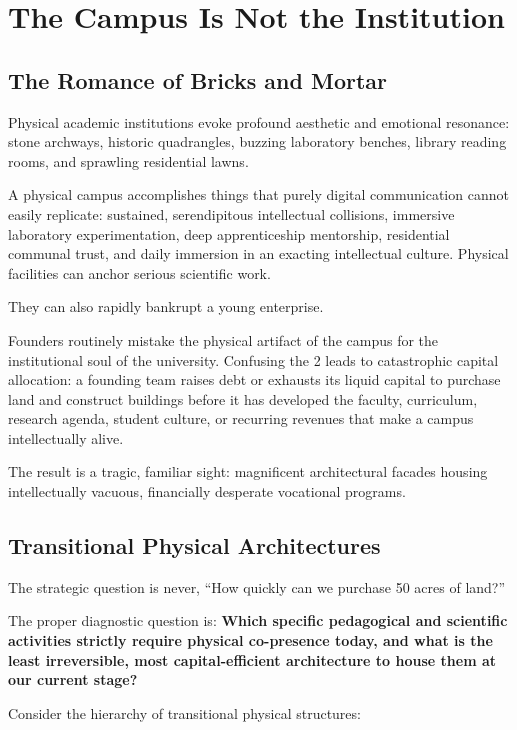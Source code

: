 \section{The Campus Is Not the Institution}

\subsection{The Romance of Bricks and Mortar}

Physical academic institutions evoke profound aesthetic and emotional resonance: stone archways, historic quadrangles, buzzing laboratory benches, library reading rooms, and sprawling residential lawns.

A physical campus accomplishes things that purely digital communication cannot easily replicate: sustained, serendipitous intellectual collisions, immersive laboratory experimentation, deep apprenticeship mentorship, residential communal trust, and daily immersion in an exacting intellectual culture. Physical facilities can anchor serious scientific work.

They can also rapidly bankrupt a young enterprise.

Founders routinely mistake the physical artifact of the campus for the institutional soul of the university. Confusing the 2 leads to catastrophic capital allocation: a founding team raises debt or exhausts its liquid capital to purchase land and construct buildings before it has developed the faculty, curriculum, research agenda, student culture, or recurring revenues that make a campus intellectually alive.

The result is a tragic, familiar sight: magnificent architectural facades housing intellectually vacuous, financially desperate vocational programs.

\subsection{Transitional Physical Architectures}

The strategic question is never, ``How quickly can we purchase 50 acres of land?''

The proper diagnostic question is: \textbf{Which specific pedagogical and scientific activities strictly require physical co-presence today, and what is the least irreversible, most capital-efficient architecture to house them at our current stage?}

Consider the hierarchy of transitional physical structures:

